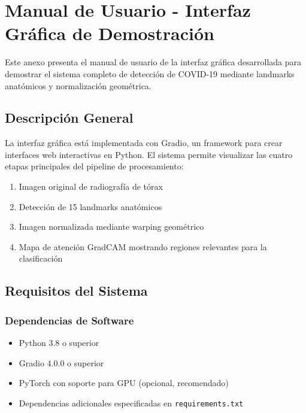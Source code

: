 \chapter{Manual de Usuario - Interfaz Gráfica de Demostración}
\label{anexo:manual_usuario}

Este anexo presenta el manual de usuario de la interfaz gráfica desarrollada para demostrar el sistema completo de detección de COVID-19 mediante landmarks anatómicos y normalización geométrica.

\section{Descripción General}

La interfaz gráfica está implementada con Gradio, un framework para crear interfaces web interactivas en Python. El sistema permite visualizar las cuatro etapas principales del pipeline de procesamiento:

\begin{enumerate}
    \item Imagen original de radiografía de tórax
    \item Detección de 15 landmarks anatómicos
    \item Imagen normalizada mediante warping geométrico
    \item Mapa de atención GradCAM mostrando regiones relevantes para la clasificación
\end{enumerate}

\section{Requisitos del Sistema}

\subsection{Dependencias de Software}

\begin{itemize}
    \item Python 3.8 o superior
    \item Gradio 4.0.0 o superior
    \item PyTorch con soporte para GPU (opcional, recomendado)
    \item Dependencias adicionales especificadas en \texttt{requirements.txt}
\end{itemize}

